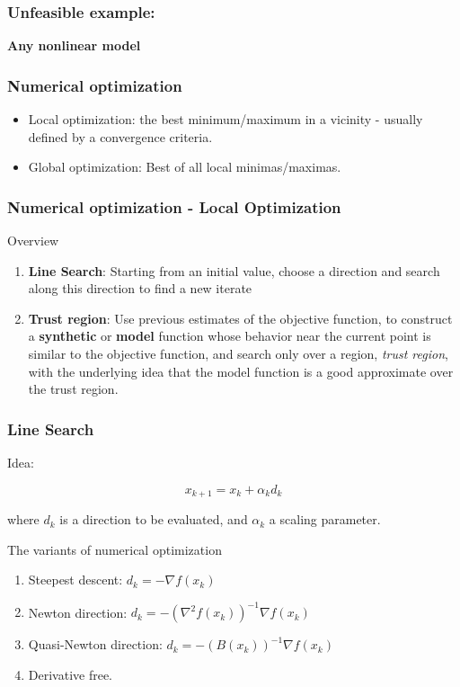 \documentclass{beamer}
\newcommand{\1}{\mathbb{1}}
\begin{document}
\begin{frame}\frametitle{Unfeasible example: }
\centering \textbf{Any nonlinear model}
\end{frame}

\begin{frame}\frametitle{Numerical optimization}
\begin{itemize}
\item Local optimization: the best minimum/maximum in a vicinity - usually defined by a convergence criteria.
\item Global optimization: Best of all local minimas/maximas.
\end{itemize}
\end{frame}

\begin{frame}\frametitle{Numerical optimization - Local Optimization}
Overview
\begin{enumerate}
\item \textbf{Line Search}: Starting from an initial value, choose a direction and search along this direction to find a new iterate  
\item \textbf{Trust region}: Use previous estimates of the objective function, to construct a \textbf{synthetic} or \textbf{model} function whose behavior near the current point is similar to the objective function, and search only over a region, \textit{trust region}, with the underlying idea that the model function is a good approximate over the trust region. 
\end{enumerate}
\end{frame}


\begin{frame}\frametitle{Line Search}
Idea:

\begin{equation*}
x_{k+1} = x_k + \alpha_k d_k 
\end{equation*}

where $d_k$ is a direction to be evaluated, and $\alpha_k$ a scaling parameter. 

The variants of numerical optimization 
\begin{enumerate}
\item Steepest descent: $d_k = - \nabla f(x_k)$
\item Newton direction: $d_k = - (\nabla^2 f(x_k))^{-1}\nabla f(x_k)$
\item Quasi-Newton direction: $d_k = - (B(x_k))^{-1}\nabla f(x_k)$
\item Derivative free.
\end{enumerate}
\end{frame}
\end{document}
